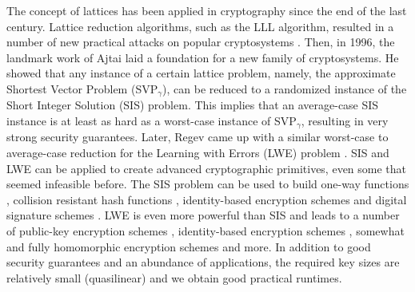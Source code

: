 \documentclass[
  a4paper,  %
  twoside,  %
  bibliography=totoc,
  headsepline,
  cleardoublepage=empty,
  parskip=half,
  draft=false
]{scrbook}
\begin{document}
The concept of lattices has been applied in cryptography since the end of the last century. Lattice reduction algorithms, such as the LLL algorithm, resulted in a number of new practical attacks on popular cryptosystems \cite{NV10}. Then, in 1996, the landmark work of Ajtai \cite{Ajt96} laid a foundation for a new family of cryptosystems. He showed that any instance of a certain lattice problem, namely, the approximate Shortest Vector Problem (SVP$_\gamma$), can be reduced to a randomized instance of the Short Integer Solution (SIS) problem. This implies that an average-case SIS instance is at least as hard as a worst-case instance of SVP$_\gamma$, resulting in very strong security guarantees. Later, Regev came up with a similar worst-case to average-case reduction for the Learning with Errors (LWE) problem \cite{Reg05}. SIS and LWE can be applied to create advanced cryptographic primitives, even some that seemed infeasible before. The SIS problem can be used to build one-way functions \cite{Ajt96, MR04}, collision resistant hash functions \cite{GGH96}, identity-based encryption schemes \cite{Lyu08} and digital signature schemes \cite{LM08, GPV08}. LWE is even more powerful than SIS and leads to a number of public-key encryption schemes \cite{Reg05, PW08, LPR10}, identity-based encryption schemes \cite{GPV08, ABB10}, somewhat and fully homomorphic encryption schemes \cite{Gen09a,BV11,GSW13} and more.
In addition to good security guarantees and an abundance of applications, the required key sizes are relatively small (quasilinear) and we obtain good practical runtimes.

%

\end{document}
